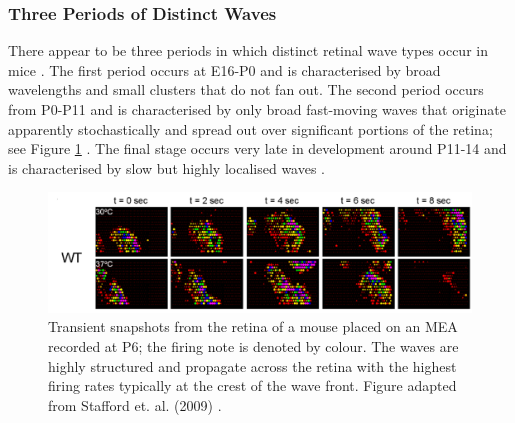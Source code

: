 \subsubsection{Three Periods of Distinct Waves}
There appear to be three periods in which distinct retinal wave types occur in mice \cite{Bansal2000-ts}. The first period occurs at E16-P0 and is characterised by broad wavelengths and small clusters that do not fan out. The second period occurs from P0-P11 and is characterised by only broad fast-moving waves that originate apparently stochastically and spread out over significant portions of the retina; see Figure \ref{fig:wtwaves} \cite{Ackman2012-uu, Stafford2009, Bansal2000-ts}. The final stage occurs very late in development around P11-14 and is characterised by slow but highly localised waves \cite{Bansal2000-ts}.
\begin{figure}
	\centering
	\includegraphics[width = \textwidth]{images/introduction/meaWaves}
	\def\c{Transient snapshots from the retina of a mouse placed on an MEA recorded at P6; the firing note is denoted by colour. }
	\caption[\c]{\label{fig:wtwaves} \c The waves are highly structured and propagate across the retina with the highest firing rates typically at the crest of the wave front. Figure adapted from Stafford et. al. (2009) \cite{Stafford2009}.}
\end{figure}
